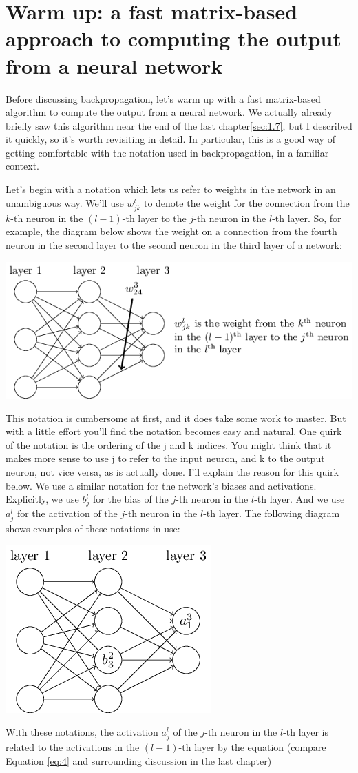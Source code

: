 \documentclass[a4paper,twoside,10pt]{book}
\begin{document}
\section{Warm up: a fast matrix-based approach to computing the output from a neural network}
Before discussing backpropagation, let's warm up with a fast matrix-based algorithm to compute the output from a neural network. We actually already briefly saw this algorithm near the end of the last chapter\ref{sec:1.7}, but I described it quickly, so it's worth revisiting in detail. In particular, this is a good way of getting comfortable with the notation used in backpropagation, in a familiar context.

Let's begin with a notation which lets us refer to weights in the network in an unambiguous way. We'll use $w^l_{jk}$ to denote the weight for the connection from the $k$-th neuron in the $(l-1)$-th layer to the $j$-th neuron in the $l$-th layer. So, for example, the diagram below shows the weight on a connection from the fourth neuron in the second layer to the second neuron in the third layer of a network:

\begin{center}
	\includegraphics[width=0.7\linewidth]{./figures/ch2/tikz16}
\end{center}
This notation is cumbersome at first, and it does take some work to master. But with a little effort you'll find the notation becomes easy and natural. One quirk of the notation is the ordering of the j and k indices. You might think that it makes more sense to use j to refer to the input neuron, and k to the output neuron, not vice versa, as is actually done. I'll explain the reason for this quirk below.
We use a similar notation for the network's biases and activations. Explicitly, we use $b^l_j$ for the bias of the $j$-th neuron in the $l$-th layer. And we use $a^l_j$ for the activation of the $j$-th neuron in the $l$-th layer. The following diagram shows examples of these notations in use:
\begin{center}
\includegraphics[width=0.45\linewidth]{./figures/ch2/tikz17}
\end{center}
With these notations, the activation $a^l_j$ of the $j$-th neuron in the $l$-th layer is related to the activations in the $(l-1)$-th layer by the equation (compare Equation \ref{eq:4} and surrounding discussion in the last chapter)
\end{document}
